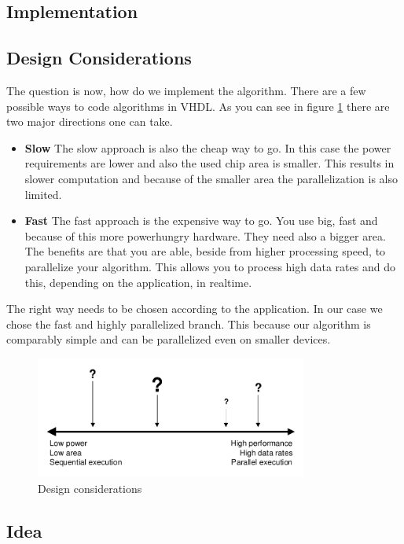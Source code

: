 \begin{refsection}
\section{Implementation}

\subsection{Design Considerations}

The question is now, how do we implement the algorithm. There are a few possible ways to code algorithms in VHDL. As you can see in figure \ref{fpga:designcon} there are two major directions one can take.

\begin{itemize}
	\item \textbf{Slow} The slow  approach is also the cheap way to go. In this case the power requirements are lower and also the used chip area is smaller. This results in slower computation and because of the smaller area the parallelization is also limited.
	
	\item \textbf{Fast} The fast approach is the expensive way to go. You use big, fast and because of this more powerhungry hardware. They need also a bigger area. The benefits are that you are able, beside from higher processing speed, to parallelize your algorithm. This allows you to process high data rates and do this, depending on the application, in realtime.  
\end{itemize}
The right way needs to be chosen according to the application. In our case we chose the fast and highly parallelized branch. This because our algorithm is comparably simple and can be parallelized even on smaller devices. 
\begin{figure}
	\centering
	\includegraphics[width=0.8\textwidth]{images/design_considerations.pdf}
	\caption{Design considerations \label{fpga:designcon}}
\end{figure}

\subsection{Idea}


\end{refsection}
